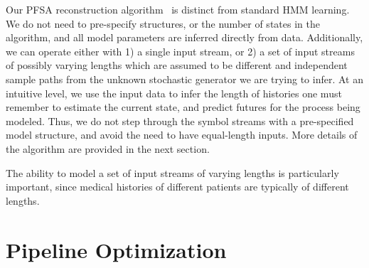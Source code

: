 \documentclass[3p,super,numbers,sort&compress,preprint,10pt]{elsarticle}
\begin{document}
Our PFSA reconstruction algorithm~\cite{CL12g} is distinct from standard HMM learning. We do not need to pre-specify structures, or the number of states in the algorithm, and all model parameters are inferred directly from data. Additionally, we can operate either  with 1) a single input stream, or  2) a set of input streams of possibly varying lengths which are assumed to be different and independent sample paths from the unknown stochastic generator we are trying to infer. At an intuitive level, we use the input data to infer the length of histories one must remember to estimate the current state, and predict futures for the process being modeled. Thus, we do not step     through the symbol streams with a pre-specified model structure, and  avoid the need to have equal-length inputs. More details of the algorithm are provided in the next section.

The ability to model a set of input streams of varying lengths is particularly important, since medical histories of different patients are typically of different lengths.

% 
%  
% 







\section{Pipeline Optimization}\label{sec:pipeline}









\end{document}
